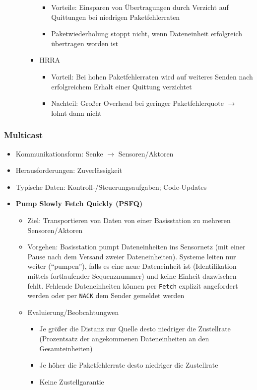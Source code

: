 \begin{itemize}
\begin{itemize}
\begin{itemize}
\begin{itemize}
				\item Vorteile: Einsparen von Übertragungen durch Verzicht auf Quittungen bei niedrigen Paketfehlerraten
				\item Paketwiederholung stoppt nicht, wenn Dateneinheit erfolgreich übertragen worden ist
			\end{itemize}
			\item HRRA
			\begin{itemize}
				\item Vorteil: Bei hohen Paketfehlerraten wird auf weiteres Senden nach erfolgreichem Erhalt einer Quittung verzichtet
				\item Nachteil: Großer Overhead bei geringer Paketfehlerquote \(\rightarrow\) lohnt dann nicht
			\end{itemize}
		\end{itemize}
	\end{itemize}
\end{itemize}

\subsubsection{Multicast}
\begin{itemize}
	\item Kommunikationsform: Senke \(\rightarrow\) Sensoren/Aktoren
	\item Herausforderungen: Zuverlässigkeit
	\item Typische Daten: Kontroll-/Steuerungsaufgaben; Code-Updates
	\item \textbf{Pump Slowly Fetch Quickly (PSFQ)}
	\begin{itemize}
		\item Ziel: Transportieren von Daten von einer Basisstation zu mehreren Sensoren/Aktoren
		\item Vorgehen: Basisstation pumpt Dateneinheiten ins Sensornetz (mit einer Pause nach dem Versand zweier Dateneinheiten). Systeme leiten nur weiter ("`pumpen"'), falls es eine neue Dateneinheit ist (Identifikation mittels fortlaufender Sequenznummer) und keine Einheit dazwischen fehlt. Fehlende Dateneinheiten können per \texttt{Fetch} explizit angefordert werden oder per \texttt{NACK} dem Sender gemeldet werden
		\item Evaluierung/Beobcahtungwen
		\begin{itemize}
			\item Je größer die Distanz zur Quelle desto niedriger die Zustellrate (Prozentsatz der angekommenen Dateneinheiten an den Gesamteinheiten)
			\item Je höher die Paketfehlerrate desto niedriger die Zustellrate
			\item Keine Zustellgarantie
		\end{itemize}
	\end{itemize}
\end{itemize}

